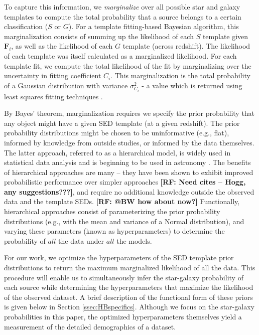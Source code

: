 \documentclass[12pt,preprint]{aastex}
\newcommand{\datavector}[1]{\boldsymbol{#1}}
\newcommand\rf[1]{{\bf [RF: #1]}}
\begin{document}

To capture this information, we \textit{marginalize} over all possible
star and galaxy templates to compute the total probability that a
source belongs to a certain classification ($S$ or $G$).  For a
template fitting-based Bayesian algorithm, this marginalization
consists of summing up the likelihood of each $S$ template given
$\datavector{F}_i$, as well as the likelihood of each $G$ template
(across redshift).  The likelihood of each template was itself
calculated as a marginalized likelihood.  For each template fit, we
compute the total likelihood of the fit by marginalizing over the
uncertainty in fitting coefficient $C_i$.  This marginalization is the
total probability of a Gaussian distribution with variance
$\sigma_{C_i}^2$ - a value which is returned using least squares
fitting techniques \citep[e.g.,][]{hogg10}.

By Bayes' theorem, marginalization requires we specify the prior
probability that any object might have a given SED template (at a
given redshift).  The prior probability distributions might be chosen
to be uninformative (e.g., flat), informed by knowledge from outside
studies, or informed by the data themselves.  The latter approach,
referred to as a hierarchical model, is widely used in statistical
data analysis \citep[e.g.,][]{gelman03} and is beginning to be used in
astronomy \citep{shu12}.  The benefits of hierarchical approaches are
many -- they have been shown to exhibit improved probabilistic performance
over simpler approaches \rf{Need cites -- Hogg, any suggestions???}, and require no additional
knowledge outside the observed data and the template SEDs.  \rf{@BW how about 
now?} Functionally,
hierarchical approaches consist of parameterizing the prior
probability distributions (e.g., with the mean and variance of a
Normal distribution), and varying these parameters (known as
hyperparameters) to determine the probability of $all$ the data under
$all$ the models.

For our work, we optimize the hyperparameters of the SED template
prior distributions to return the maximum marginalized likelihood of
all the data.  This procedure will enable us to simultaneously infer
the star-galaxy probability of each source while determining the
hyperparameters that maximize the likelihood of the observed dataset.
A brief description of the functional form of these priors is given
below in Section \ref{ssec:HBspecifics}.  Although we focus on the
star-galaxy probabilities in this paper, the optimized hyperparameters
themselves yield a measurement of the detailed demographics of a
dataset. 
\end{document}
